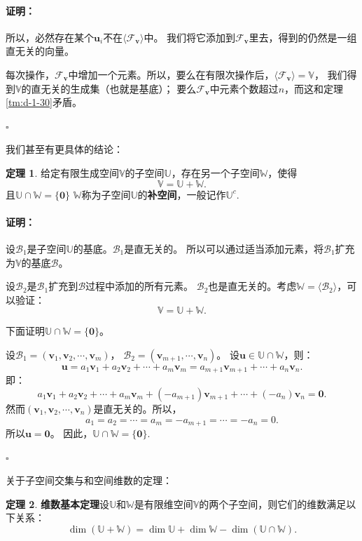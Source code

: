\documentclass[12pt,UTF8]{ctexbook}
\theoremstyle{definition}
\newtheorem{tm}{定理}[section]
\theoremstyle{plain}
\renewenvironment{proof}{\paragraph{\textbf{证明：}}}{\hfill$\square$}
\begin{document}
\begin{appendix}
\begin{proof}
    所以，必然存在某个$\mathbf{u}_i$不在$\langle\mathcal{F}_{\mathbf{v}}\rangle$中。
    我们将它添加到$\mathcal{F}_{\mathbf{v}}$里去，得到的仍然是一组直无关的向量。

    每次操作，$\mathcal{F}_{\mathbf{v}}$中增加一个元素。所以，要么在有限次操作后，$\langle\mathcal{F}_{\mathbf{v}}\rangle = \mathbb{V}$，
    我们得到$\mathbb{V}$的直无关的生成集（也就是基底）；
    要么$\mathcal{F}_{\mathbf{v}}$中元素个数超过$n$，而这和定理\ref{tm:d-1-30}矛盾。

\end{proof}

我们甚至有更具体的结论：
\begin{tm}\label{tm:d-1-70}
    给定有限生成空间$\mathbb{V}$的子空间$\mathbb{U}$，存在另一个子空间$\mathbb{W}$，使得
    $$ \mathbb{V} = \mathbb{U} + \mathbb{W}.$$
    且$\mathbb{U} \cap \mathbb{W} = \{\mathbf{0}\}$
    $\mathbb{W}$称为子空间$\mathbb{U}$的\textbf{补空间}，一般记作$\mathbb{U}^c.$
\end{tm}

\begin{proof}
    设$\mathcal{B}_1$是子空间$\mathbb{U}$的基底。$\mathcal{B}_1$是直无关的。
    所以可以通过适当添加元素，将$\mathcal{B}_1$扩充为$\mathbb{V}$的基底$\mathcal{B}$。

    设$\mathcal{B}_2$是$\mathcal{B}_1$扩充到$\mathcal{B}$过程中添加的所有元素。
    $\mathcal{B}_2$也是直无关的。考虑$\mathbb{W} = \langle\mathcal{B}_2\rangle$，可以验证：
    $$ \mathbb{V} = \mathbb{U} + \mathbb{W}.$$

    下面证明$ \mathbb{U} \cap \mathbb{W} = \{\mathbf{0}\}$。

    设$\mathcal{B}_1 = (\mathbf{v}_1, \mathbf{v}_2, \cdots , \mathbf{v}_m )$，
    $\mathcal{B}_2 = (\mathbf{v}_{m+1}, \cdots , \mathbf{v}_n )$。 
    设$ \mathbf{u} \in \mathbb{U} \cap \mathbb{W}$，则：
    $$ \mathbf{u} = a_1\mathbf{v}_1 + a_2\mathbf{v}_2 + \cdots + a_m\mathbf{v}_m = a_{m+1}\mathbf{v}_{m+1} + \cdots + a_n\mathbf{v}_n. $$
    即：
    $$a_1\mathbf{v}_1 + a_2\mathbf{v}_2 + \cdots + a_m\mathbf{v}_m + (-a_{m+1})\mathbf{v}_{m+1} + \cdots + (-a_{n})\mathbf{v}_{n} = \mathbf{0}. $$
    然而$(\mathbf{v}_1, \mathbf{v}_2, \cdots , \mathbf{v}_n )$是直无关的。所以，
    $$ a_1 = a_2 = \cdots = a_m = -a_{m+1} = \cdots = -a_n = 0.$$
    所以$\mathbf{u} = \mathbf{0}$。
    因此，$ \mathbb{U} \cap \mathbb{W} = \{\mathbf{0}\}$.

\end{proof}

关于子空间交集与和空间维数的定理：
\begin{tm}{\textbf{维数基本定理}}\label{tm:d-1-80}
    设$\mathbb{U}$和$\mathbb{W}$是有限维空间$\mathbb{V}$的两个子空间，则它们的维数满足以下关系：
    $$ \dim (\mathbb{U} + \mathbb{W}) = \dim \mathbb{U} + \dim \mathbb{W} - \dim (\mathbb{U} \cap \mathbb{W}).$$
\end{tm}


\end{appendix}
\end{document}
